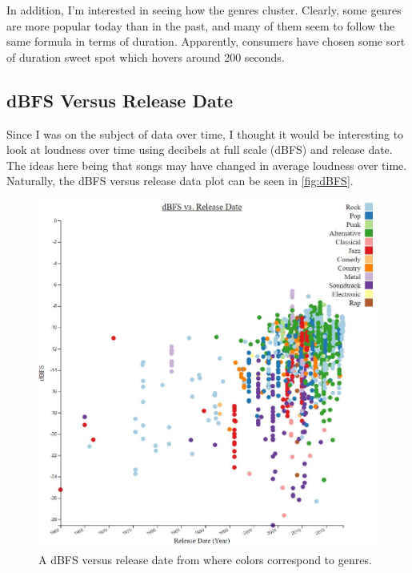 \documentclass[journal]{vgtc}                %
\begin{document}
In addition, I'm interested in seeing how the genres cluster. Clearly, some
genres are more popular today than in the past, and many of them seem to
follow the same formula in terms of duration. Apparently, consumers have
chosen some sort of duration sweet spot which hovers around 200 seconds.

\subsection{dBFS Versus Release Date}

Since I was on the subject of data over time, I thought it would be interesting
to look at loudness over time using decibels at full scale (dBFS) and release
date. The ideas here being that songs may have changed in average loudness over
time. Naturally, the dBFS versus release data plot can be seen in
\autoref{fig:dBFS}.

\begin{figure}[h]
 \centering %
 \includegraphics[width=\columnwidth]{dbfs-vs-release-date}
 \caption{A dBFS versus release date from \cite{Grifski:2019:dBFS} where colors correspond to genres.}
 \label{fig:dBFS}
\end{figure}
\end{document}
